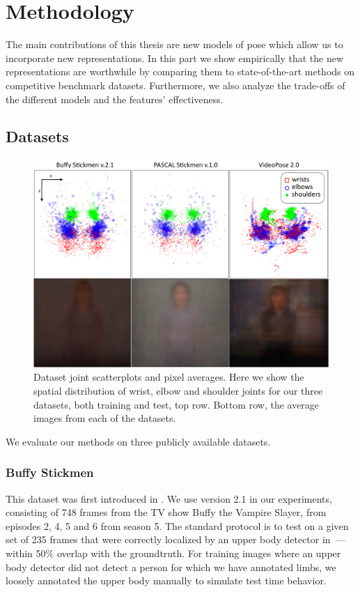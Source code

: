 \chapter{Methodology}
The main contributions of this thesis are new models of pose which allow us to 
incorporate new representations.  In this part we show empirically that the new 
representations are worthwhile by comparing them to state-of-the-art methods on 
competitive benchmark datasets.  Furthermore, we also analyze the trade-offs of 
the different models and the features' effectiveness.

\section{Datasets}\label{sec:datasets}
\begin{figure}[tb]
\begin{center}
\includegraphics[width=1.05\textwidth]{figs/dataset-scatterplots.pdf}
\caption[Dataset joint scatterplots and pixel averages.]{Dataset joint 
scatterplots and pixel averages.  Here we show the spatial distribution of 
wrist, elbow and shoulder joints for our three datasets, both training and 
test, top row.  Bottom row, the average images from each of the datasets.}
\label{fig:dataset-scatterplots}
\end{center}
\end{figure}



We evaluate our methods on three publicly available datasets.

\subsection{Buffy Stickmen}
This dataset was first introduced in \citet{ferrari08}.  We use version 2.1 in 
our experiments, consisting of 748 frames from the TV show Buffy the Vampire 
Slayer, from episodes 2, 4, 5 and 6 from season 5.  The standard protocol is to 
test on a given set of 235 frames that were correctly localized by an upper 
body detector in~\citet{ferrari08}---within 50\% overlap with the groundtruth.  
For training images where an upper body detector did not detect a person for 
which we have annotated limbs, we loosely annotated the upper body manually to 
simulate test time behavior.
  

